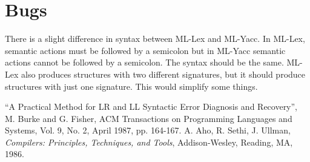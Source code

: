 \documentclass{article}
\begin{document}
\section{Bugs}

There is a slight difference in syntax between ML-Lex and ML-Yacc.
In ML-Lex, semantic actions must be followed by a semicolon but
in ML-Yacc semantic actions cannot be followed by a semicolon.
The syntax should be the same.  ML-Lex also produces structures with
two different signatures, but it should produce structures with just
one signature.  This would simplify some things.

\begin{thebibliography}{9}

 ``A Practical Method for LR and LL Syntactic Error
Diagnosis and Recovery'', M. Burke and G. Fisher,
ACM Transactions on Programming Languages and
Systems, Vol. 9, No. 2, April 1987, pp. 164-167.
 A. Aho, R. Sethi, J. Ullman, {\em Compilers: Principles,
Techniques, and Tools}, Addison-Wesley, Reading, MA, 1986.

\end{thebibliography}
\end{document}

